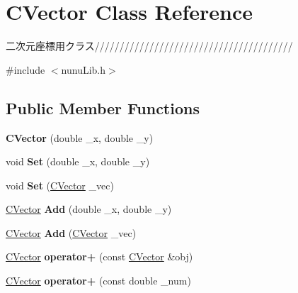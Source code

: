 \hypertarget{class_c_vector}{}\section{C\+Vector Class Reference}
\label{class_c_vector}


二次元座標用クラス////////////////////////////////////////  




{\ttfamily \#include $<$nunu\+Lib.\+h$>$}

\subsection*{Public Member Functions}
\begin{DoxyCompactItemize}
\item 
{\bfseries C\+Vector} (double \+\_\+x, double \+\_\+y)\hypertarget{class_c_vector_a451a6c62586656cfe33154149c105497}{}\label{class_c_vector_a451a6c62586656cfe33154149c105497}

\item 
void {\bfseries Set} (double \+\_\+x, double \+\_\+y)\hypertarget{class_c_vector_a2e2cc67a3107846821114920e756abab}{}\label{class_c_vector_a2e2cc67a3107846821114920e756abab}

\item 
void {\bfseries Set} (\hyperlink{class_c_vector}{C\+Vector} \+\_\+vec)\hypertarget{class_c_vector_a74b5df8d6cd2e914d416559c40c373f7}{}\label{class_c_vector_a74b5df8d6cd2e914d416559c40c373f7}

\item 
\hyperlink{class_c_vector}{C\+Vector} {\bfseries Add} (double \+\_\+x, double \+\_\+y)\hypertarget{class_c_vector_a932beef92cd5d375bd2542dff8a09c9d}{}\label{class_c_vector_a932beef92cd5d375bd2542dff8a09c9d}

\item 
\hyperlink{class_c_vector}{C\+Vector} {\bfseries Add} (\hyperlink{class_c_vector}{C\+Vector} \+\_\+vec)\hypertarget{class_c_vector_a05667e0f3cd5430b17477404532e37d4}{}\label{class_c_vector_a05667e0f3cd5430b17477404532e37d4}

\item 
\hyperlink{class_c_vector}{C\+Vector} {\bfseries operator+} (const \hyperlink{class_c_vector}{C\+Vector} \&obj)\hypertarget{class_c_vector_a6a08eefba0f23479f379c6501015988f}{}\label{class_c_vector_a6a08eefba0f23479f379c6501015988f}

\item 
\hyperlink{class_c_vector}{C\+Vector} {\bfseries operator+} (const double \+\_\+num)\hypertarget{class_c_vector_a9238a10280a584f3d6342d72f766d0fb}{}\label{class_c_vector_a9238a10280a584f3d6342d72f766d0fb}


\end{DoxyCompactItemize}
